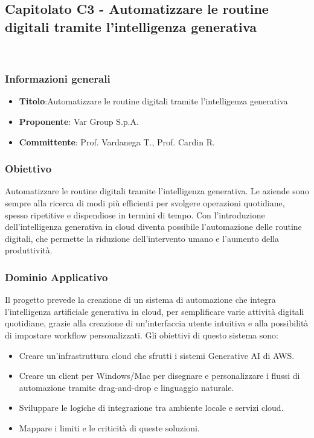 \subsection{Capitolato C3 - Automatizzare le routine digitali tramite l’intelligenza generativa}
    \ \subsubsection{Informazioni generali}
        \begin{itemize}
            \item \textbf{Titolo}:Automatizzare le routine digitali tramite l’intelligenza generativa
            \item \textbf{Proponente}: Var Group S.p.A.
            \item \textbf{Committente}: Prof. Vardanega T., Prof. Cardin R.
        \end{itemize}
     \subsubsection{Obiettivo}
   Automatizzare le routine digitali tramite l’intelligenza generativa. Le aziende sono sempre alla ricerca di modi più efficienti per svolgere operazioni quotidiane, spesso ripetitive e dispendiose in termini di tempo. Con l’introduzione dell’intelligenza generativa in cloud diventa possibile l’automazione delle routine digitali, che permette la riduzione dell’intervento umano e l’aumento della produttività.

     \subsubsection{Dominio Applicativo}
    Il progetto prevede la creazione di un sistema di automazione che integra l’intelligenza artificiale generativa in cloud, per semplificare varie attività digitali quotidiane, grazie alla creazione di un’interfaccia utente intuitiva e alla possibilità di impostare workflow personalizzati.
Gli obiettivi di questo sistema sono:

\begin{itemize}
    \item Creare un’infrastruttura cloud che sfrutti i sistemi Generative AI di AWS.
    \item Creare un client per Windows/Mac per disegnare e personalizzare i flussi di automazione tramite drag-and-drop e linguaggio naturale.
    \item Sviluppare le logiche di integrazione tra ambiente locale e servizi cloud.
    \item Mappare i limiti e le criticità di queste soluzioni.
\end{itemize}
